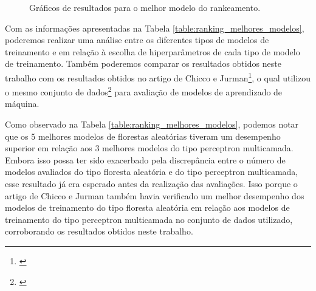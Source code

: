 \begin{figure}[h]
{    \label{fig:best_results_boxplot}
  }
	\caption{Gráficos de resultados para o melhor modelo do rankeamento.}
	\label{fig:best_results_plot}
\end{figure}

Com as informações apresentadas na Tabela \ref{table:ranking_melhores_modelos}, poderemos realizar uma análise entre os diferentes tipos de modelos de treinamento e em relação à escolha de hiperparâmetros de cada tipo de modelo de treinamento. Também poderemos comparar os resultados obtidos neste trabalho com os resultados obtidos no artigo de Chicco e Jurman\footnote{\cite{chicco2020}}, o qual utilizou o mesmo conjunto de dados\footnote{\cite{larxel_dataset}} para avaliação de modelos de aprendizado de máquina.

Como observado na Tabela \ref{table:ranking_melhores_modelos}, podemos notar que os 5 melhores modelos de florestas aleatórias tiveram um desempenho superior em relação aos 3 melhores modelos do tipo perceptron multicamada. Embora isso possa ter sido exacerbado pela discrepância entre o número de modelos avaliados do tipo floresta aleatória e do tipo perceptron multicamada, esse resultado já era esperado antes da realização das avaliações. Isso porque o artigo de Chicco e Jurman também havia verificado um melhor desempenho dos modelos de treinamento do tipo floresta aleatória em relação aos modelos de treinamento do tipo perceptron multicamada no conjunto de dados utilizado, corroborando os resultados obtidos neste trabalho.

